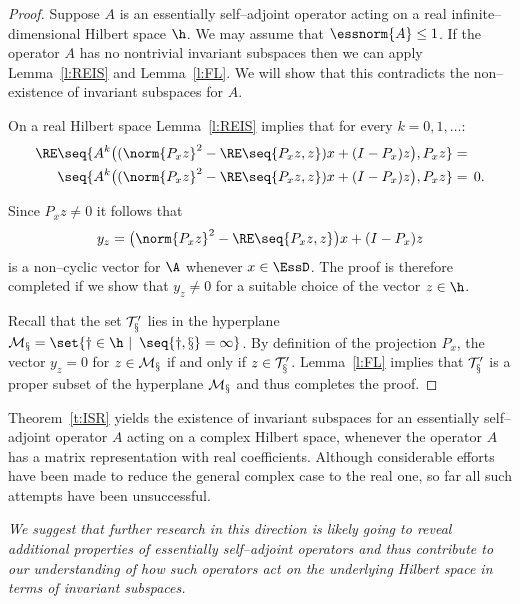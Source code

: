 \begin{proof}
Suppose $A$ is an essentially self--adjoint operator acting on
a real infinite--dimensional Hilbert space $\h$. We may assume
that $\essnorm{A}\leq1$. If the operator $A$ has no nontrivial
invariant subspaces then we can apply Lemma~\ref{l:REIS} and
Lemma~\ref{l:FL}. We will show that this contradicts the
non--existence of invariant subspaces for $A$.

On a real Hilbert space Lemma~\ref{l:REIS} implies that for
every $k=0,1,\ldots$:
\begin{equation*}
\begin{split}
   \RE\seq{A^k\big((\norm{P_x z}^2 - \RE\seq{P_x z,z})x + (I-P_x)z\big),
   P_x z} & = \\
      \seq{A^k\big((\norm{P_x z}^2 - \RE\seq{P_x z,z})x + (I-P_x)z\big),
   P_x z} & = \, 0.
\end{split}
\end{equation*}

Since $P_x z\neq0$ it follows that
\begin{equation*}
   y_z = \big(\norm{P_x z}^2 - \RE\seq{P_x z,z}\big)x + (I-P_x)z
\end{equation*}
is a non--cyclic vector for $\A$ whenever $x\in\EssD$. The
proof is therefore completed if we show that $y_z\neq0$ for a
suitable choice of the vector $z\in\h$.

Recall that the set $\cal{T}'_x$ lies in the hyperplane
$\cal{M}_x=\set{y\in\h\,\,|\,\,\,\seq{y,x}=1}$. By definition
of the projection $P_x$, the vector $y_z=0$ for $z\in\cal{M}_x$
if and only if $z\in\cal{T}'_x$. Lemma~\ref{l:FL} implies that
$\cal{T}'_x$ is a proper subset of the hyperplane $\cal{M}_x$
and thus completes the proof.
\end{proof}

\smallskip

\begin{rem}
Theorem~\ref{t:ISR} yields the existence of invariant subspaces
for an essentially self--adjoint operator $A$ acting on a
complex Hilbert space, whenever the operator $A$ has a matrix
representation with real coefficients. Although considerable
efforts have been made to reduce the general complex case to
the real one, so far all such attempts have been unsuccessful.
\end{rem}

\bigskip
\goodbreak

\emph{We suggest that further research in this direction is
likely going to reveal additional properties of essentially
self--adjoint operators and thus contribute to our
understanding of how such operators act on the underlying
Hilbert space in terms of invariant subspaces.}

